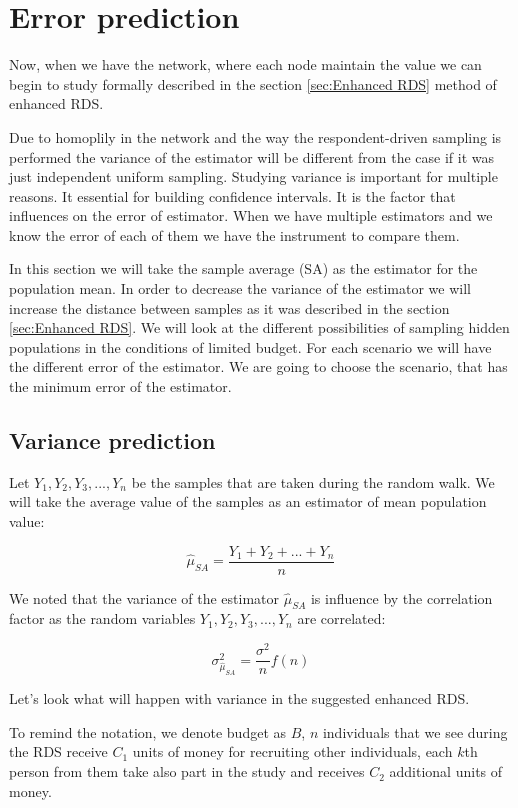 \documentclass[12pt]{report}
\begin{document}
\section{Error prediction}

Now, when we have the network, where each node maintain the value we can begin to study formally described in the section 
\ref{sec:Enhanced RDS} method of enhanced RDS.

Due to homoplily in the network and the way the respondent-driven sampling is performed the variance of the estimator will be different from the case if it was just independent uniform sampling. Studying variance is important for multiple reasons. It essential for building confidence intervals. It is the factor that influences on the error of estimator. When we have multiple estimators and we know the error of each of them we have the instrument to compare them.


In this section we will take the sample average (SA) as the estimator for the population mean. In order to decrease the variance of the estimator we will increase the distance between samples as it was described in the section \ref{sec:Enhanced RDS}. We will look at the different possibilities of sampling hidden populations in the conditions of limited budget. For each scenario we will have the different error of the estimator. We are going to choose the scenario, that has the minimum error of the estimator. 

\subsection{Variance prediction}

Let $Y_1, Y_2, Y_3,..., Y_n$ be the samples that are taken during the random walk. We will take the average value of the samples as an estimator of mean population value:

$$ \widehat{\mu}_{SA} = \frac{Y_1 + Y_2 + ... + Y_n}{n}$$

We noted that the variance of the estimator $\widehat{\mu}_{SA}$ is influence by the correlation factor as the random variables $Y_1, Y_2, Y_3,..., Y_n$ are correlated:

$$ \sigma^2_{\hat{\mu}_{SA}} = \frac{\sigma^2}{n} f(n)$$

Let's look what will happen with variance in the suggested enhanced RDS.

To remind the notation, we denote budget as $B$, $n$ individuals that we see during the RDS receive $C_1$ units of money for recruiting other individuals, each $k$th person from them take also part in the study and receives $C_2$ additional units of money. 
\end{document}

